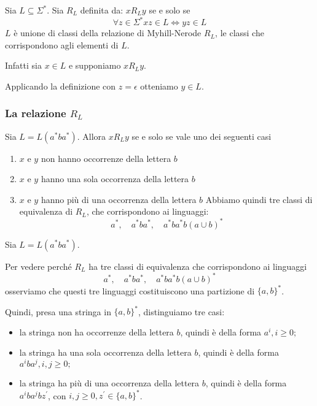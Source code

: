 Sia $L \subseteq \Sigma^{*}$. Sia $R_{L}$ definita da: $x R_{L} y$ se e solo se
$$
\forall z \in \Sigma^{*} x z \in L \Leftrightarrow y z \in L
$$
$L$ è unione di classi della relazione di Myhill-Nerode $R_{L}$, le classi che corrispondono agli elementi di $L$.

Infatti sia $x \in L$ e supponiamo $x R_{L} y$.

Applicando la definizione con $z=\epsilon$ otteniamo $y \in L$.

\subsubsection{La relazione $R_L$}

Sia $L=L\left(a^{*} b a^{*}\right)$. Allora $x R_{L} y$ se e solo se vale uno dei seguenti casi
\begin{enumerate}
    \item $x$ e $y$ non hanno occorrenze della lettera $b$
    \item $x$ e $y$ hanno una sola occorrenza della lettera $b$
    \item $x$ e $y$ hanno più di una occorrenza della lettera $b$
Abbiamo quindi tre classi di equivalenza di $R_{L}$, che corrispondono ai linguaggi:
$$
a^{*}, \quad a^{*} b a^{*}, \quad a^{*} b a^{*} b(a \cup b)^{*}
$$

\end{enumerate}

Sia $L=L\left(a^{*} b a^{*}\right)$.

Per vedere perché $R_{L}$ ha tre classi di equivalenza che corrispondono ai linguaggi
$$
a^{*}, \quad a^{*} b a^{*}, \quad a^{*} b a^{*} b(a \cup b)^{*}
$$
osserviamo che questi tre linguaggi costituiscono una partizione di $\{a, b\}^{*}$.

Quindi, presa una stringa in $\{a, b\}^{*}$, distinguiamo tre casi: 
\begin{itemize}
    \item  la stringa non ha occorrenze della lettera $b$, quindi è della forma $a^{i}, i \geq 0 ;$
    \item la stringa ha una sola occorrenza della lettera $b$, quindi è della forma $a^{i} b a^{j}, i, j \geq 0 ;$
    \item la stringa ha più di una occorrenza della lettera $b$, quindi è della forma $a^{i} b a^{j} b z^{\prime}$, con $i, j \geq 0, z^{\prime} \in\{a, b\}^{*}$.

\end{itemize}

